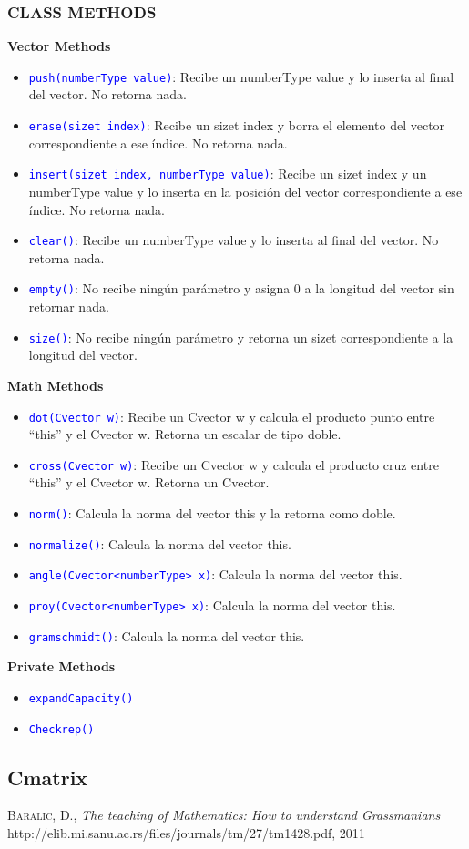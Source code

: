 \documentclass{article}
\def\code#1{\texttt{#1}}
\begin{document}
\subsubsection{\textbf{CLASS METHODS}}
\textbf{Vector Methods}
\begin{itemize}
	\item \textcolor{blue}{\code{push(numberType value)}}: Recibe un numberType value y lo inserta al final del vector. No retorna nada.
	\item \textcolor{blue}{\code{erase(sizet index)}}: Recibe un sizet index y borra el elemento del vector correspondiente a ese índice. No retorna nada.
	\item \textcolor{blue}{\code{insert(sizet index, numberType value)}}: Recibe un sizet index y un numberType value y lo inserta en la posición del vector correspondiente a ese índice. No retorna nada.
	\item \textcolor{blue}{\code{clear()}}: Recibe un numberType value y lo inserta al final del vector. No retorna nada.
	\item \textcolor{blue}{\code{empty()}}: No recibe ningún parámetro y asigna 0 a la longitud del vector sin retornar nada.
	\item \textcolor{blue}{\code{size()}}:  No recibe ningún parámetro y retorna un sizet correspondiente a la longitud del vector.
\end{itemize}
\textbf{Math Methods}
\begin{itemize}
	\item \textcolor{blue}{\code{dot(Cvector w)}}: Recibe un Cvector w y calcula el producto punto entre “this” y el Cvector w. Retorna un escalar de tipo doble.
	\item \textcolor{blue}{\code{cross(Cvector w)}}: Recibe un Cvector w y calcula el producto cruz entre “this” y el Cvector w. Retorna un Cvector. 
	\item \textcolor{blue}{\code{norm()}}: Calcula la norma del vector this y la retorna como doble.
	\item \textcolor{blue}{\code{normalize()}}: Calcula la norma del vector this.
	\item \textcolor{blue}{\code{angle(Cvector<numberType> x)}}: Calcula la norma del vector this.
	\item \textcolor{blue}{\code{proy(Cvector<numberType> x)}}: Calcula la norma del vector this.
	\item \textcolor{blue}{\code{gramschmidt()}}: Calcula la norma del vector this.
\end{itemize}
\textbf{Private Methods}
\begin{itemize}
    \item \textcolor{blue}{\code{expandCapacity()}}
    \item \textcolor{blue}{\code{Checkrep()}}

\end{itemize}

\subsection{Cmatrix}



    
\begin{thebibliography}{a}
 \textsc{Baralic, D.},
\textit{The teaching of Mathematics: How to understand Grassmanians}
http://elib.mi.sanu.ac.rs/files/journals/tm/27/tm1428.pdf, 2011  
\end{thebibliography}
\end{document}
